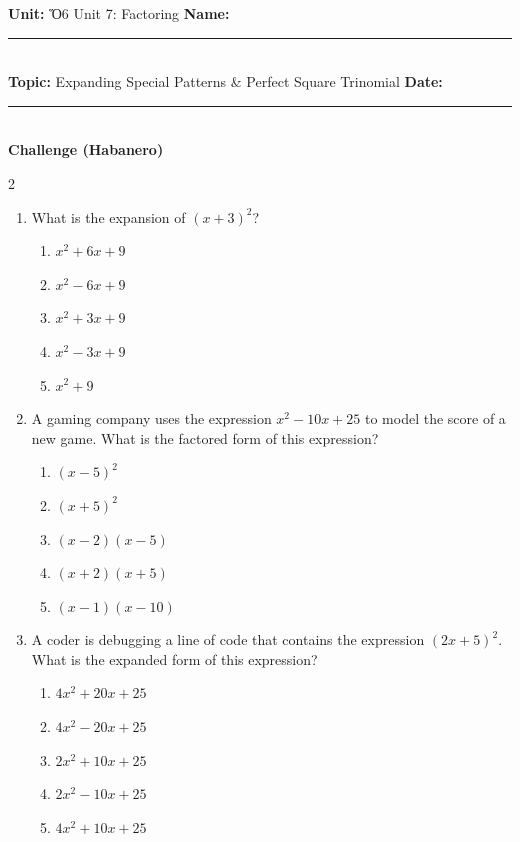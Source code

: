 \documentclass[10pt]{article}
\begin{document}
\enlargethispage{2.5cm}

\begin{tcolorbox}[colback=mainblue!5, colframe=mainblue, sharp corners, boxrule=0.5pt]
    \small \textbf{Unit:} Ὅ6 Unit 7: Factoring \hfill \textbf{Name:} \rule{3cm}{0.4pt} \\
    \small \textbf{Topic:} Expanding Special Patterns & Perfect Square Trinomial \hfill \textbf{Date:} \rule{2cm}{0.4pt} \\
    \centering \textbf{\large Challenge (Habanero)}
\end{tcolorbox}

\vspace{0.2cm}

\begin{multicols}{2}
\begin{enumerate}[label=\textbf{Q\arabic*.}, leftmargin=*, itemsep=6pt, parsep=0pt]

  \item \small What is the expansion of $(x + 3)^2$?
  \begin{enumerate}[label=(\Alph*), leftmargin=0.6cm, nosep, itemsep=2pt]
    \item $x^2 + 6x + 9$
    \item $x^2 - 6x + 9$
    \item $x^2 + 3x + 9$
    \item $x^2 - 3x + 9$
    \item $x^2 + 9$
  \end{enumerate}

  \item \small A gaming company uses the expression $x^2 - 10x + 25$ to model the score of a new game. What is the factored form of this expression?
  \begin{enumerate}[label=(\Alph*), leftmargin=0.6cm, nosep, itemsep=2pt]
    \item $(x - 5)^2$
    \item $(x + 5)^2$
    \item $(x - 2)(x - 5)$
    \item $(x + 2)(x + 5)$
    \item $(x - 1)(x - 10)$
  \end{enumerate}

  \item \small A coder is debugging a line of code that contains the expression $(2x + 5)^2$. What is the expanded form of this expression?
  \begin{enumerate}[label=(\Alph*), leftmargin=0.6cm, nosep, itemsep=2pt]
    \item $4x^2 + 20x + 25$
    \item $4x^2 - 20x + 25$
    \item $2x^2 + 10x + 25$
    \item $2x^2 - 10x + 25$
    \item $4x^2 + 10x + 25$
  \end{enumerate}


\end{enumerate}
\end{multicols}
\end{document}
